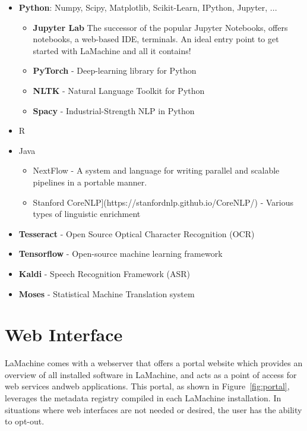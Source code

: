 \documentclass[a4paper,11pt]{article}
\begin{document}
\begin{itemize}
    \item \textbf{Python}: Numpy, Scipy, Matplotlib, Scikit-Learn, IPython, Jupyter, ...
    \begin{itemize}
        \item \textbf{Jupyter Lab} The successor of the popular Jupyter Notebooks, offers notebooks, a web-based IDE, terminals. An ideal entry point to get started with LaMachine and all it contains!
        \item \textbf{PyTorch} - Deep-learning library for Python
        \item \textbf{NLTK} - Natural Language Toolkit for Python
        \item \textbf{Spacy} - Industrial-Strength NLP in Python
    \end{itemize}
    \item R
    \item Java
    \begin{itemize}
        \item NextFlow - A system and language for writing parallel and scalable pipelines in a portable manner.
        \item Stanford CoreNLP](https://stanfordnlp.github.io/CoreNLP/) - Various types of linguistic enrichment
    \end{itemize}
    \item \textbf{Tesseract} - Open Source Optical Character Recognition (OCR)
    \item \textbf{Tensorflow} - Open-source machine learning framework
    \item \textbf{Kaldi} - Speech Recognition Framework (ASR)
    \item \textbf{Moses} - Statistical Machine Translation system
\end{itemize}





\section{Web Interface}

LaMachine comes with a webserver that offers a portal website which provides an overview of all installed software in
LaMachine, and acts as a point of access for web services andweb applications. This portal, as shown in
Figure~\ref{fig:portal}, leverages the metadata
registry compiled in each LaMachine installation. In situations where web interfaces are not needed or desired, the
user has the ability to opt-out.
\end{document}
